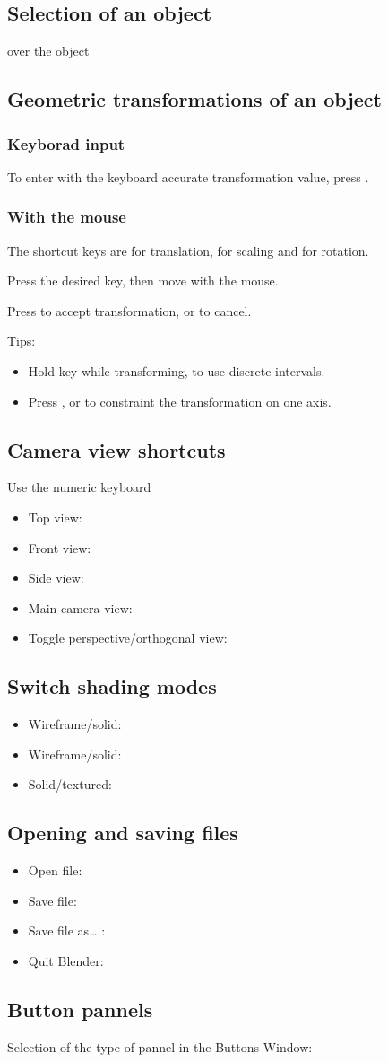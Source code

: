 \documentclass[twoside,a4paper,10pt]{report}
\newcommand{\dokutitleleveltree}[1]{\subsection{#1}}
\newcommand{\dokutitlelevelfour}[1]{\subsubsection{#1}}
\newcommand{\dokuitem}{\item}
\begin{document}
\dokutitleleveltree{Selection of an object}
\label{d461f4bc8beb6b0a8442d6d4da3a0c6d}%
 over the object


\dokutitleleveltree{Geometric transformations of an object}
\label{001ad77ecf37a2b719f6d1a347faed00}%

\dokutitlelevelfour{Keyborad input}

To enter with the keyboard accurate transformation value, press .


\dokutitlelevelfour{With the mouse}
The shortcut keys are  for translation,  for scaling and
  for rotation.

Press the desired key, then move with the mouse.

Press  to accept transformation, or  to cancel.

Tips:


\begin{itemize}
\dokuitem  Hold  key while transforming, to use discrete intervals. 
\dokuitem  Press ,  or  to constraint the transformation on one axis.
\end{itemize}

\dokutitleleveltree{Camera view shortcuts}
\label{490b5cdd607bc3b8891df904de25d417}%
Use the numeric keyboard


\begin{itemize}
\dokuitem  Top view: 
\dokuitem  Front view: 
\dokuitem  Side view: 
\dokuitem  Main camera view: 
\dokuitem  Toggle perspective/orthogonal view: 
\end{itemize}

\dokutitleleveltree{Switch shading modes}
\label{930ca388b865b6b10e3f5eb29f9bb084}%

\begin{itemize}
\dokuitem  Wireframe/solid: 
\dokuitem  Wireframe/solid: 
\dokuitem  Solid/textured: 
\end{itemize}

\dokutitleleveltree{Opening and saving files}
\label{0b2dd5c17c378b3048db1b45587a2d17}%

\begin{itemize}
\dokuitem  Open file: 
\dokuitem  Save file: 
\dokuitem  Save file as\ldots{} : 
\dokuitem  Quit Blender: 
\end{itemize}

\dokutitleleveltree{Button pannels}
\label{ec1467299d35fb7adfeb7b88dce3d414}%
Selection of the type of pannel in the Buttons Window:
\end{document}
